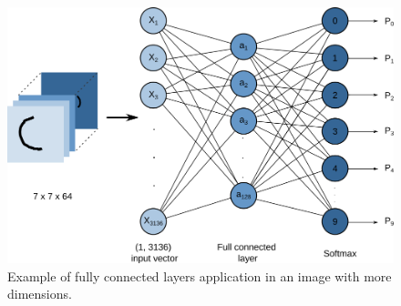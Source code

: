 \begin{figure}
    \centering
    \includegraphics[scale=0.50]{images/figure124.png}
    \caption{Example of fully connected layers application in an image with more dimensions.}
    \label{fig:figure124}
\end{figure}

